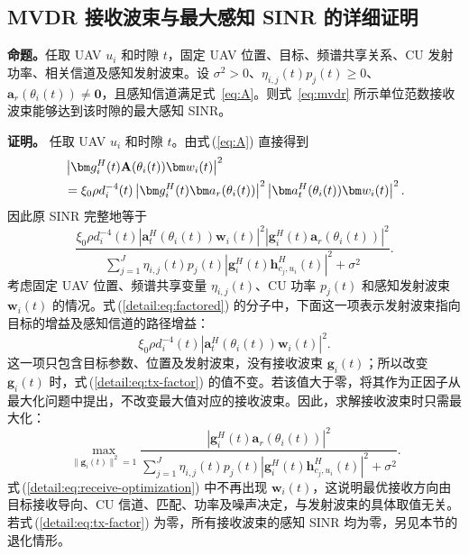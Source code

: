 \subsection{MVDR 接收波束与最大感知 SINR 的详细证明}

\noindent\textbf{命题。}任取 UAV $u_i$ 和时隙 $t$，固定 UAV 位置、目标、频谱共享关系、CU 发射功率、相关信道及感知发射波束。设 $\sigma^2>0$、$\eta_{i,j}(t)p_j(t)\ge0$、$\bm a_r(\theta_i(t))\ne\bm0$，且感知信道满足式~\eqref{eq:A}。则式~\eqref{eq:mvdr} 所示单位范数接收波束能够达到该时隙的最大感知 SINR。

\medskip
\noindent\textbf{证明。}
任取 UAV $u_i$ 和时隙 $t$。由式\,(\ref{eq:A}) 直接得到
\begin{align}
&\left|\bm g_i^H(t)\mathbf A(\theta_i(t))\bm w_i(t)\right|^2\notag\\
&=\xi_0\rho d_i^{-4}(t)
\left|\bm g_i^H(t)\bm a_r(\theta_i(t))\right|^2
\left|\bm a_t^H(\theta_i(t))\bm w_i(t)\right|^2.\label{detail:eq:factor}
\end{align}
因此原 SINR 完整地等于
\begin{equation}\label{detail:eq:factored}
\frac{\xi_0\rho d_i^{-4}(t)
\left|\bm a_t^H(\theta_i(t))\bm w_i(t)\right|^2
\left|\bm g_i^H(t)\bm a_r(\theta_i(t))\right|^2}
{\displaystyle\sum_{j=1}^J\eta_{i,j}(t)p_j(t)
\left|\bm g_i^H(t)\bm h_{c_j,u_i}^{H}(t)\right|^2+\sigma^2}.
\end{equation}
考虑固定 UAV 位置、频谱共享变量 $\eta_{i,j}(t)$、CU 功率 $p_j(t)$ 和感知发射波束 $\bm w_i(t)$ 的情况。式\,(\ref{detail:eq:factored}) 的分子中，下面这一项表示发射波束指向目标的增益及感知信道的路径增益：
\begin{equation}\label{detail:eq:tx-factor}
\xi_0\rho d_i^{-4}(t)
\left|\bm a_t^H(\theta_i(t))\bm w_i(t)\right|^2.
\end{equation}
这一项只包含目标参数、位置及发射波束，没有接收波束 $\bm g_i(t)$；所以改变 $\bm g_i(t)$ 时，式\,(\ref{detail:eq:tx-factor}) 的值不变。若该值大于零，将其作为正因子从最大化问题中提出，不改变最大值对应的接收波束。因此，求解接收波束时只需最大化：
\begin{equation}\label{detail:eq:receive-optimization}
\max_{\|\bm g_i(t)\|^2=1}
\frac{\left|\bm g_i^H(t)\bm a_r(\theta_i(t))\right|^2}
{\displaystyle\sum_{j=1}^J\eta_{i,j}(t)p_j(t)
\left|\bm g_i^H(t)\bm h_{c_j,u_i}^{H}(t)\right|^2+\sigma^2}.
\end{equation}
式\,(\ref{detail:eq:receive-optimization}) 中不再出现 $\bm w_i(t)$，这说明最优接收方向由目标接收导向、CU 信道、匹配、功率及噪声决定，与发射波束的具体取值无关。若式\,(\ref{detail:eq:tx-factor}) 为零，所有接收波束的感知 SINR 均为零，另见本节的退化情形。

